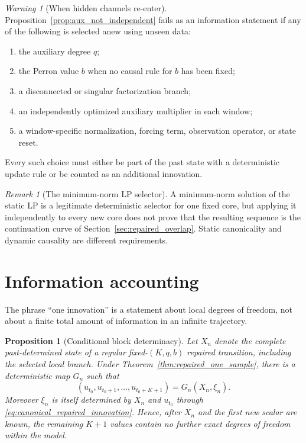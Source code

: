 \documentclass[11pt]{amsart}
\numberwithin{equation}{section}
\theoremstyle{plain}
\newtheorem{proposition}[theorem]{Proposition}
\theoremstyle{definition}
\theoremstyle{remark}
\newtheorem{remark}[theorem]{Remark}
\newtheorem{warning}[theorem]{Warning}
\begin{document}
\begin{warning}[When hidden channels re-enter]
\label{warn:hidden_channels_reenter}
Proposition~\ref{prop:aux_not_independent} fails as an information statement if any of the following is selected anew using unseen data:
\begin{enumerate}
\item the auxiliary degree $q$;
\item the Perron value $b$ when no causal rule for $b$ has been fixed;
\item a disconnected or singular factorization branch;
\item an independently optimized auxiliary multiplier in each window;
\item a window-specific normalization, forcing term, observation operator, or state reset.
\end{enumerate}
Every such choice must either be part of the past state with a deterministic update rule or be counted as an additional innovation.
\end{warning}

\begin{remark}[The minimum-norm LP selector]
\label{rem:minnorm_not_dynamic}
A minimum-norm solution of the static LP is a legitimate deterministic selector for one fixed core, but applying it independently to every new core does not prove that the resulting sequence is the continuation curve of Section~\ref{sec:repaired_overlap}. Static canonicality and dynamic causality are different requirements.
\end{remark}

\section{Information accounting}
\label{sec:information_accounting}

The phrase ``one innovation'' is a statement about local degrees of freedom, not about a finite total amount of information in an infinite trajectory.

\begin{proposition}[Conditional block determinacy]
\label{prop:conditional_block_determinacy}
Let $X_n$ denote the complete past-determined state of a regular fixed-$(K,q,b)$ repaired transition, including the selected local branch. Under Theorem~\ref{thm:repaired_one_sample}, there is a deterministic map $G_n$ such that
\begin{equation}
\left(u_{t_0},u_{t_0+1},\ldots,u_{t_0+K+1}\right)=G_n(X_n,\xi_n).
\label{eq:block_as_state_innovation}
\end{equation}
Moreover $\xi_n$ is itself determined by $X_n$ and $u_{t_0}$ through \eqref{eq:canonical_repaired_innovation}. Hence, after $X_n$ and the first new scalar are known, the remaining $K+1$ values contain no further exact degrees of freedom within the model.
\end{proposition}
\end{document}
